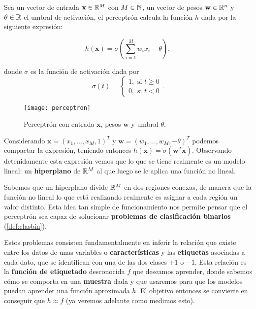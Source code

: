 \begin{definicion}[Perceptrón]
  Sea un vector de entrada $\textbf{x} \in \mathbb{R}^M$ con $M \in \mathbb{N}$, un vector de pesos $\textbf{w} \in \mathbb{R}^n$ y $\theta \in \mathbb{R}$ el umbral de activación, el perceptrón calcula la función $h$ dada por la siguiente expresión:

  $$h(\textbf{x}) = \sigma\left(\sum \limits^M_{i = 1}w_i x_i - \theta\right),$$

   donde $\sigma$ es la función de activación dada por $$\sigma(t) = \begin{cases} 1, \text{ si } t \geq 0 \\ 0, \text{ si } t < 0 \end{cases}.$$
   \label{def:perceptron}
\end{definicion}

\begin{figure}[htpb]
  \centering
  \texttt{[image: perceptron]}
  \caption{Perceptrón con entrada $\textbf{x}$, pesos $\textbf{w}$ y umbral $\theta$.}
  \label{fig:perceptron}
\end{figure}

Considerando $\textbf{x} = (x_1, \ldots, x_M, 1)^T$ y $\textbf{w} = (w_1, \ldots, w_M, -\theta)^T$ podemos compactar la expresión, teniendo entonces $h(\textbf{x}) = \sigma(\textbf{w}^T \textbf{x})$. Observando detenidamente esta expresión vemos que lo que se tiene realmente es un modelo lineal: un \textbf{hiperplano} de $\mathbb{R}^{M}$ al que luego se le aplica una función no lineal.

Sabemos que un hiperplano divide $\mathbb{R}^{M}$ en dos regiones conexas, de manera que la función no lineal lo que está realizando realmente es asignar a cada región un valor distinto. Esta idea tan simple de funcionamiento nos permite pensar que el perceptrón sea capaz de solucionar \textbf{problemas de clasificación binarios}  (\autoref{def:clasbin}).

Estos problemas consisten fundamentalmente en inferir la relación que existe entre los datos de unas variables o \textbf{características} y las \textbf{etiquetas} asociadas a cada dato, que se identifican con una de las dos clases $+1$ o $-1$. Esta relación es la \textbf{función de etiquetado} desconocida $f$ que deseamos aprender, donde sabemos cómo se comporta en una \textbf{muestra} dada y que usaremos para que los modelos puedan aprender una función aproximada $h$. El objetivo entonces se convierte en conseguir que $h \approx f$ (ya veremos adelante como medimos esto).

